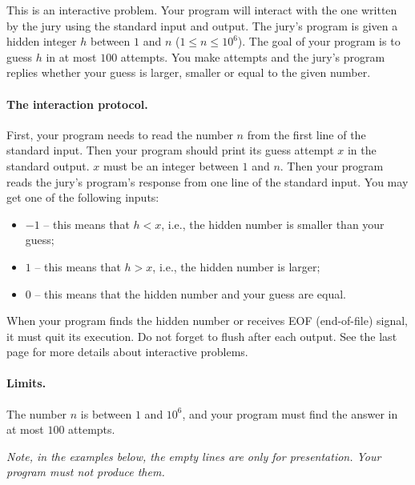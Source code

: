 This is an interactive problem.
Your program will interact with the one written by the jury using the standard input and output.
The jury’s program is given a hidden integer $h$ between $1$ and $n$ ($1 \leq n \leq 10^6$).
The goal of your program is to guess $h$ in at most $100$ attempts.
You make attempts and the jury's program replies whether your guess is larger, smaller or equal to the given number.

\paragraph{The interaction protocol.}
First, your program needs to read the number $n$ from the first line of the standard input.
Then your program should print its guess attempt $x$ in the standard output.
$x$ must be an integer between $1$ and $n$.
Then your program reads the jury’s program’s response from one line of the standard input.
You may get one of the following inputs:
\begin{itemize}
    \item $-1$ -- this means that $h < x$, i.e., the hidden number is smaller than your guess;
    \item $1$ -- this means that $h > x$, i.e., the hidden number is larger;
    \item $0$ -- this means that the hidden number and your guess are equal.
\end{itemize}
When your program finds the hidden number or receives EOF (end-of-file) signal, it must quit its execution.
Do not forget to flush after each output.
See the last page for more details about interactive problems.

\paragraph{Limits.}
The number $n$ is between $1$ and $10^6$, and your program must find the answer in at most $100$ attempts.

\emph{Note, in the examples below, the empty lines are only for presentation.
Your program must not produce them.}
{
\renewcommand{\sampleinputname}{Jury's feedback}
\renewcommand{\sampleoutputname}{Your attempts}
}

